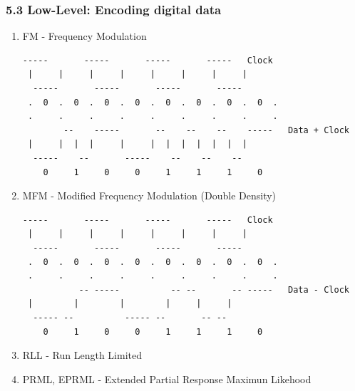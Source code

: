 \begin{frame}[fragile]
  \frametitle{5.3 Low-Level: Encoding digital data}
        \begin{enumerate}
            \item FM - Frequency Modulation
\begin{lstlisting}[basicstyle=\tiny]
        -----       -----       -----       -----   Clock
 |     |     |     |     |     |     |     |
  -----       -----       -----       -----
 .  0  .  0  .  0  .  0  .  0  .  0  .  0  .  0  .
 .     .     .     .     .     .     .     .     .
        --    -----       --    --    --    -----   Data + Clock
 |     |  |  |     |     |  |  |  |  |  |  |
  -----    --       -----    --    --    --
    0     1     0     0     1     1     1     0
\end{lstlisting}
	    \item MFM - Modified Frequency Modulation (Double Density)
\begin{lstlisting}[basicstyle=\tiny]
        -----       -----       -----       -----   Clock
 |     |     |     |     |     |     |     |
  -----       -----       -----       -----
 .  0  .  0  .  0  .  0  .  0  .  0  .  0  .  0  .
 .     .     .     .     .     .     .     .     .
           -- -----          -- --       -- -----   Data - Clock
 |        |        |        |     |     |    
  ----- --          ----- --       -- --    
    0     1     0     0     1     1     1     0
\end{lstlisting}
	    \item RLL - Run Length Limited
	    \item PRML, EPRML - Extended Partial Response Maximun Likehood
        \end{enumerate}
\end{frame}




